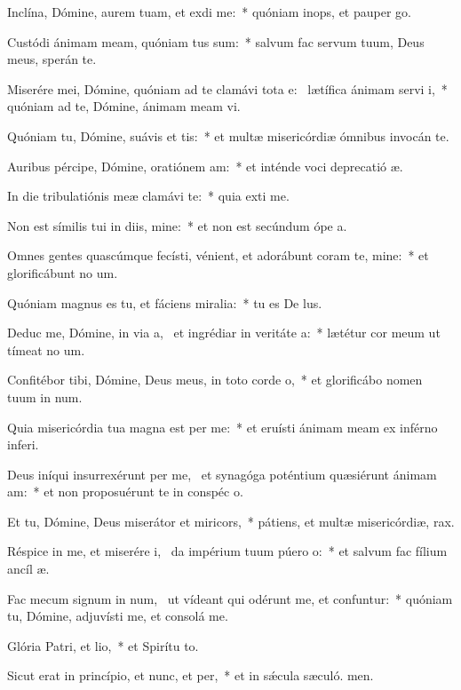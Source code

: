 \item Inclína, Dómine, aurem tuam, et exdi me:~* quóniam inops, et pauper  go.
\item Custódi ánimam meam, quóniam tus sum:~* salvum fac servum tuum, Deus meus, sperán  te.
\item Miserére mei, Dómine, quóniam ad te clamávi tota e:~\pscross{} lætífica ánimam servi i,~* quóniam ad te, Dómine, ánimam meam vi.
\item Quóniam tu, Dómine, suávis et tis:~* et multæ misericórdiæ ómnibus invocán te.
\item Auribus pércipe, Dómine, oratiónem am:~* et inténde voci deprecatió æ.
\item In die tribulatiónis meæ clamávi  te:~* quia exti me.
\item Non est símilis tui in diis, mine:~* et non est secúndum ópe a.
\item Omnes gentes quascúmque fecísti, vénient, et adorábunt coram te, mine:~* et glorificábunt no um.
\item Quóniam magnus es tu, et fáciens miralia:~* tu es De lus.
\item Deduc me, Dómine, in via a,~\pscross{} et ingrédiar in veritáte a:~* lætétur cor meum ut tímeat no um.
\item Confitébor tibi, Dómine, Deus meus, in toto corde o,~* et glorificábo nomen tuum in num.
\item Quia misericórdia tua magna est per me:~* et eruísti ánimam meam ex inférno inferi.
\item Deus iníqui insurrexérunt per me,~\pscross{} et synagóga poténtium quæsiérunt ánimam am:~* et non proposuérunt te in conspéc o.
\item Et tu, Dómine, Deus miserátor et miricors,~* pátiens, et multæ misericórdiæ,  rax.
\item Réspice in me, et miserére i,~\pscross{} da impérium tuum púero o:~* et salvum fac fílium ancíl æ.
\item Fac mecum signum in num,~\pscross{} ut vídeant qui odérunt me, et confuntur:~* quóniam tu, Dómine, adjuvísti me, et consolá  me.
\item Glória Patri, et lio,~* et Spirítu to.
\item Sicut erat in princípio, et nunc, et per,~* et in sǽcula sæculó. men.
